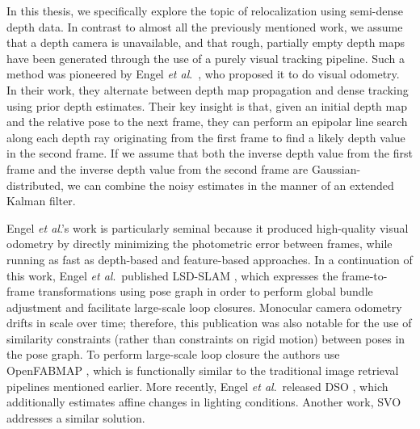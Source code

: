 In this thesis, we specifically explore the topic of relocalization using semi-dense depth data. In contrast to almost all the previously mentioned work, we assume that a depth camera is unavailable, and that rough, partially empty depth maps have been generated through the use of a purely visual tracking pipeline. Such a method was pioneered by Engel \textit{et al}.\ \cite{engel2013semi}, who proposed it to do visual odometry. In their work, they alternate between depth map propagation and dense tracking using prior depth estimates. Their key insight is that, given an initial depth map and the relative pose to the next frame, they can perform an epipolar line search along each depth ray originating from the first frame to find a likely depth value in the second frame. If we assume that both the inverse depth value from the first frame and the inverse depth value from the second frame are Gaussian-distributed, we can combine the noisy estimates in the manner of an extended Kalman filter.

Engel \textit{et al}.'s work is particularly seminal because it produced high-quality visual odometry by directly minimizing the photometric error between frames, while running as fast as depth-based and feature-based approaches. In a continuation of this work, Engel \textit{et al}.\ published LSD-SLAM \cite{engel2014lsd}, which expresses the frame-to-frame transformations using pose graph in order to perform global bundle adjustment and facilitate large-scale loop closures. Monocular camera odometry drifts in scale over time; therefore, this publication was also notable for the use of similarity constraints (rather than constraints on rigid motion) between poses in the pose graph. To perform large-scale loop closure the authors use OpenFABMAP \cite{glover2012openfabmap}, which is functionally similar to the traditional image retrieval pipelines mentioned earlier. More recently, Engel \textit{et al}.\ released DSO \cite{engel2017direct}, which additionally estimates affine changes in lighting conditions. Another work, SVO \cite{forster2014svo} \cite{forster2017svo} addresses a similar solution.

\cleardoublepage
